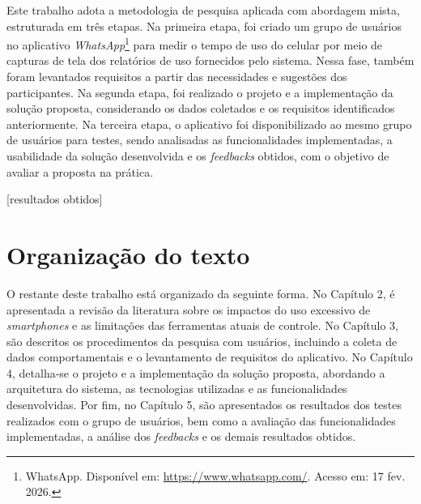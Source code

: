 Este trabalho adota a metodologia de pesquisa aplicada com abordagem mista, estruturada em três etapas. Na primeira etapa, foi criado um grupo de usuários no aplicativo \textit{WhatsApp}\footnote{WhatsApp. Disponível em: \url{https://www.whatsapp.com/}. Acesso em: 17 fev. 2026.} para medir o tempo de uso do celular por meio de capturas de tela dos relatórios de uso fornecidos pelo sistema. Nessa fase, também foram levantados requisitos a partir das necessidades e sugestões dos participantes. Na segunda etapa, foi realizado o projeto e a implementação da solução proposta, considerando os dados coletados e os requisitos identificados anteriormente. Na terceira etapa, o aplicativo foi disponibilizado ao mesmo grupo de usuários para testes, sendo analisadas as funcionalidades implementadas, a usabilidade da solução desenvolvida e os \textit{feedbacks} obtidos, com o objetivo de avaliar a proposta na prática.

[resultados obtidos]

\section{Organização do texto}

O restante deste trabalho está organizado da seguinte forma. No Capítulo 2, é apresentada a revisão da literatura sobre os impactos do uso excessivo de \textit{smartphones} e as limitações das ferramentas atuais de controle. No Capítulo 3, são descritos os procedimentos da pesquisa com usuários, incluindo a coleta de dados comportamentais e o levantamento de requisitos do aplicativo. No Capítulo 4, detalha-se o projeto e a implementação da solução proposta, abordando a arquitetura do sistema, as tecnologias utilizadas e as funcionalidades desenvolvidas. Por fim, no Capítulo 5, são apresentados os resultados dos testes realizados com o grupo de usuários, bem como a avaliação das funcionalidades implementadas, a análise dos \textit{feedbacks} e os demais resultados obtidos.

\bigskip
